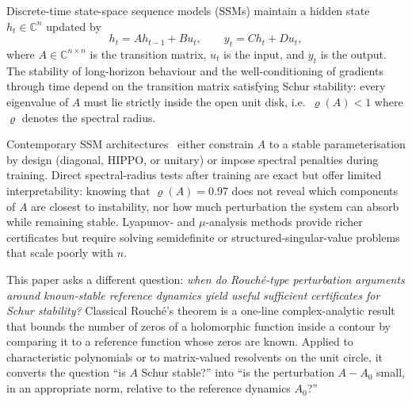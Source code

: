 \documentclass{article}
\theoremstyle{definition}
\newcommand{\C}{\mathbb{C}}
\begin{document}
Discrete-time state-space sequence models (SSMs) maintain a hidden state
$h_t \in \C^n$ updated by
\begin{equation}
  h_t = A h_{t-1} + B u_t, \qquad y_t = C h_t + D u_t,
  \label{eq:ssm}
\end{equation}
where $A \in \C^{n \times n}$ is the transition matrix, $u_t$ is the input,
and $y_t$ is the output.  The stability of long-horizon behaviour and the
well-conditioning of gradients through time depend on the transition matrix
satisfying Schur stability: every eigenvalue of $A$ must lie strictly inside
the open unit disk, i.e.\ $\varrho(A) < 1$ where $\varrho$ denotes the
spectral radius.

Contemporary SSM architectures~\cite{gu2022s4,smith2023lru,gu2023mamba} either
constrain $A$ to a stable parameterisation by design (diagonal, HIPPO, or
unitary) or impose spectral penalties during training.  Direct spectral-radius
tests after training are exact but offer limited interpretability: knowing that
$\varrho(A) = 0.97$ does not reveal which components of $A$ are closest to
instability, nor how much perturbation the system can absorb while remaining
stable.  Lyapunov- and $\mu$-analysis methods provide richer certificates but
require solving semidefinite or structured-singular-value problems that scale
poorly with $n$.

This paper asks a different question: \emph{when do Rouch\'e-type
perturbation arguments around known-stable reference dynamics yield useful
sufficient certificates for Schur stability?}  Classical Rouch\'e's theorem
is a one-line complex-analytic result that bounds the number of zeros of a
holomorphic function inside a contour by comparing it to a reference function
whose zeros are known.  Applied to characteristic polynomials or to
matrix-valued resolvents on the unit circle, it converts the question ``is
$A$ Schur stable?'' into ``is the perturbation $A - A_0$ small, in an
appropriate norm, relative to the reference dynamics $A_0$?''
\end{document}

